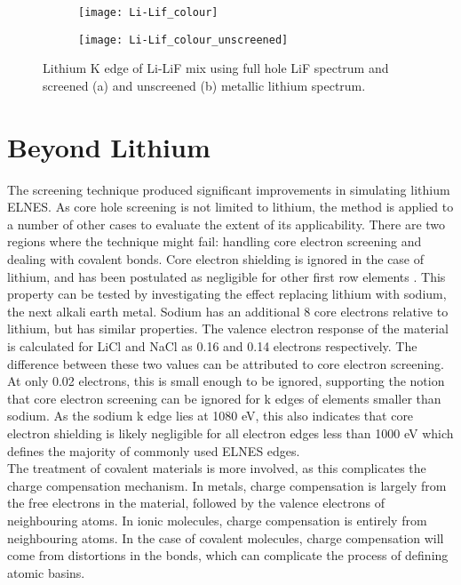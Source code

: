 \begin{figure}
	\centering
	\begin{subfigure}{0.45\textwidth}
		
		\texttt{[image: Li-Lif\_colour]}
		\caption{}
		\label{mix-screened}
	\end{subfigure}
	\hspace{-0.01cm}
	\begin{subfigure}{0.45\textwidth}
		\texttt{[image: Li-Lif\_colour\_unscreened]}
		\caption{}
		\label{mix-unscreened}
	\end{subfigure}
	\caption{Lithium K edge of Li-LiF mix using full hole LiF spectrum and screened (a) and unscreened (b) metallic lithium spectrum. }
	
	\label{Li-LiF_mix_screened}
\end{figure}



\section{Beyond Lithium}
The screening technique produced significant improvements in simulating lithium ELNES.  As core hole screening is not limited to lithium, the method is applied to a number of other cases to evaluate the extent of its applicability.  There are two regions where the technique might fail: handling core electron screening and dealing with covalent bonds.  Core electron shielding is ignored in the case of lithium, and has been postulated as negligible for other first row elements \cite{gao_theory_2008}.  This property can be tested by investigating the effect replacing lithium with sodium, the next alkali earth metal. Sodium has an additional 8 core electrons relative to lithium, but has similar properties.   The valence electron response of the material is calculated for LiCl and NaCl as 0.16 and 0.14 electrons respectively. The difference between these two values can be attributed to core electron screening.  At only 0.02 electrons, this is small enough to be ignored, supporting the notion that core electron screening can be ignored for k edges of elements smaller than sodium.  As the sodium k edge lies at 1080 eV, this also indicates that core electron shielding is likely negligible for all electron edges less than 1000 eV which defines the majority of commonly used ELNES edges.  \\

The treatment of covalent materials is more involved, as this complicates the charge compensation mechanism.  In metals, charge compensation is largely from the free electrons in the material, followed by the valence electrons of neighbouring atoms.  In ionic molecules, charge compensation is entirely from neighbouring atoms.  In the case of covalent molecules, charge compensation will come from distortions in the bonds, which can complicate the process of defining atomic basins.  





